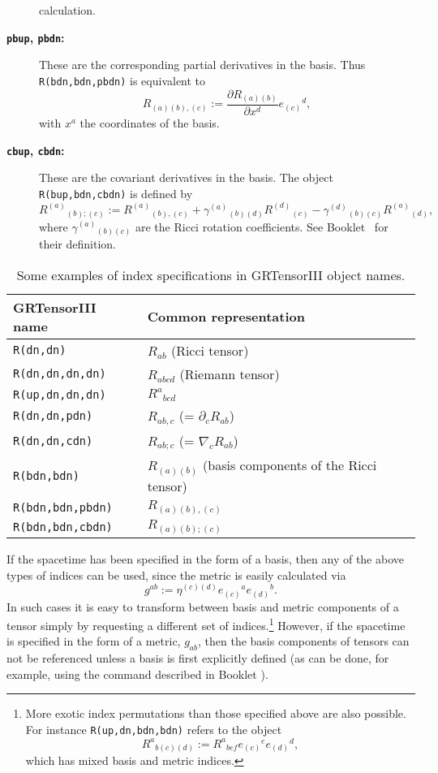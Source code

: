 \documentclass{article}
\begin{document}
\begin{description}
{    calculation.}
  \item[\textbf{\texttt{pbup}, \texttt{pbdn}:}] These are the corresponding
    partial derivatives in the basis. Thus \texttt{R(bdn,bdn,pbdn)} is
    equivalent to
    \[
      R_{(a)(b),(c)} := \frac{\partial R_{(a)(b)}}{\partial x^d}
        e_{(c)}{}^d,
    \]
    with $x^a$ the coordinates of the basis.
  \item[\textbf{\texttt{cbup}, \texttt{cbdn}:}] These are the covariant
    derivatives in the basis. The object \texttt{R(bup,bdn,cbdn)} is defined
    by
    \[
      R^{(a)}{}_{(b);(c)} := R^{(a)}{}_{(b),(c)} + \gamma^{(a)}{}_{(b)(d)}
      R^{(d)}{}_{(c)} - \gamma^{(d)}{}_{(b)(c)} R^{(a)}{}_{(d)},
    \]
    where $\gamma^{(a)}{}_{(b)(c)}$ are the Ricci rotation coefficients.
    See Booklet \grBasisRef~for their definition.
\end{description}
\begin{table}
  \begin{center}
    \begin{tabular}{ll}\hline\hline
      \textbf{GRTensorIII name} & \textbf{Common representation}\\ \hline
      \texttt{R(dn,dn)}        & $R_{ab}$ (Ricci tensor) \\
      \texttt{R(dn,dn,dn,dn)}  & $R_{abcd}$ (Riemann tensor) \\
      \texttt{R(up,dn,dn,dn)}  & $R^a{}_{bcd}$  \\
      \texttt{R(dn,dn,pdn)}    & $R_{ab,c}$ (= $\partial_c R_{ab}$)\\
      \texttt{R(dn,dn,cdn)}    & $R_{ab;c}$ (= $\nabla_c R_{ab}$)\\
      \texttt{R(bdn,bdn)}      & $R_{(a)(b)}$ (basis components of the Ricci
       tensor) \\
      \texttt{R(bdn,bdn,pbdn)} & $R_{(a)(b),(c)}$ \\
      \texttt{R(bdn,bdn,cbdn)} & $R_{(a)(b);(c)}$ \\ \hline\hline
    \end{tabular}
    \caption{Some examples of index specifications in GRTensorIII object names.}
    \label{tbl:indices}
  \end{center}
\end{table}

If the spacetime has been specified in the form of a basis, then any of
the above types of indices can be used, since the metric is easily
calculated via
\[
  g^{ab} := \eta^{(c)(d)} e_{(c)}{}^a e_{(d)}{}^b.
\]
In such cases it is easy to transform between basis and metric
components of a tensor simply by requesting a different set of
indices.\footnote{More exotic index permutations than those specified
above are also possible. For instance \texttt{R(up,dn,bdn,bdn)} refers
to the object
\[
  R^a{}_{b(c)(d)} := R^a{}_{bef} e_{(c)}{}^e e_{(d)}{}^d,
\]
which has mixed basis and metric indices.}
However, if the spacetime is specified in the form of a metric, $g_{ab}$,
then the basis components of tensors can not be referenced unless a
basis is first explicitly defined (as can be done, for example, using
the  command described in Booklet \grMakegRef).
\end{document}
